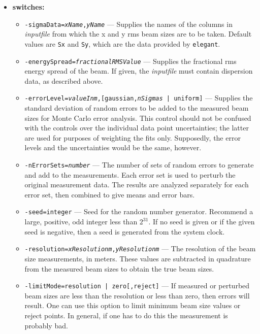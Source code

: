 \documentclass[11pt]{article}
\begin{document}
\begin{itemize}
\item {\bf switches:}
\begin{itemize}

\item {\tt -sigmaData={\em xName},{\em yName}} --- Supplies the names
of the columns in {\em inputfile} from which the x and y rms beam
sizes are to be taken.  Default values are {\tt Sx} and {\tt Sy},
which are the data provided by {\tt elegant}.

\item {\tt -energySpread={\em fractionalRMSValue}} --- Supplies the
fractional rms energy spread of the beam.  If given, the {\em
inputfile} must contain dispersion data, as described above.

\item {\tt -errorLevel={\em valueInm},[{gaussian,{\em nSigmas} |
uniform}]} --- Supplies the standard deviation of random errors to be
added to the measured beam sizes for Monte Carlo error analysis.  This
control should not be confused with the controls over the individual
data point uncertainties; the latter are used for purposes of
weighting the fits only.  Supposedly, the error levels and the
uncertainties would be the same, however.

\item {\tt -nErrorSets={\em number}} --- The number of sets of random
errors to generate and add to the measurements.  Each error set is
used to perturb the original measurement data.  The results are
analyzed separately for each error set, then combined to give means
and error bars.

\item {\tt -seed=integer} --- Seed for the random number generator.
Recommend a large, positive, odd integer less than $2^31$.  If no seed
is given or if the given seed is negative, then a seed is generated
from the system clock.

\item {\tt -resolution={\em xResolutionm},{\em yResolutionm}} --- The
resolution of the beam size measurements, in meters.  These values are
subtracted in quadrature from the measured beam sizes to obtain the
true beam sizes.

\item {\tt -limitMode={resolution | zero}[,reject]} --- If measured or
perturbed beam sizes are less than the resolution or less than zero,
then errors will result.  One can use this option to limit minimum
beam size values or reject points.  In general, if one has to do this
the measurement is probably bad.


\end{itemize}
\end{itemize}
\end{document}
